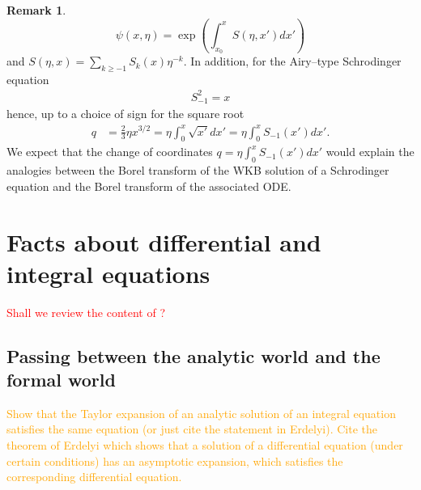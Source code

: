 \documentclass{article}
\theoremstyle{definition}
\newtheorem{remark}[definition]{Remark}
\theoremstyle{plain}
\begin{document}
{\begin{remark}
\begin{equation}
\psi(x,\eta)=\exp\left(\int_{x_0}^xS(\eta,x')dx'\right)
\end{equation} 
 and $S(\eta,x)=\sum_{k\geq -1}S_k(x)\eta^{-k}$. In addition, for the Airy--type Schrodinger equation 
 \begin{align*}
 S_{-1}^2=x
 \end{align*}
hence, up to a choice of sign for the square root
\begin{align*}
q&=\frac{2}{3}\eta x^{3/2}=\eta\int_0^x\sqrt{x'}dx'=\eta\int_{0}^xS_{-1}(x')dx'.
\end{align*}
We expect that the change of coordinates $q=\eta\int_0^{x}S_{-1}(x')dx'$ would explain the analogies between the Borel transform of the WKB solution of a Schrodinger equation and the Borel transform of the associated ODE.  
\end{remark} 

\section{Facts about differential and integral equations}\label{apx:generalities_ODEs}
\textcolor{red}{Shall we review the content of \cite{reg-sing-volterra}?}
\subsection{Passing between the analytic world and the formal world}
\textcolor{orange}{Show that the Taylor expansion of an analytic solution of an integral equation satisfies the same equation (or just cite the statement in Erdelyi). Cite the theorem of Erdelyi which shows that a solution of a differential equation (under certain conditions) has an asymptotic expansion, which satisfies the corresponding differential equation.}
}
\end{document}
